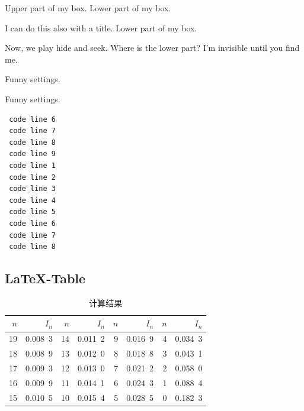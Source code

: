 \begin{tcolorbox}[colback=green!5,colframe=green!75!black]
  Upper part of my box.
  \tcblower
  Lower part of my box.
\end{tcolorbox}

\begin{tcolorbox}[colback=yellow!5,colframe=yellow!75!black,title=My title]
  I can do this also with a title.
  \tcblower
  Lower part of my box.
\end{tcolorbox}

\begin{tcolorbox}[colback=yellow!10,colframe=red!75!black,lowerbox=invisible,
  savelowerto=\jobname_ex.tex]
  Now, we play hide and seek. Where is the lower part?
  \tcblower
  I'm invisible until you find me.
\end{tcolorbox}

\begin{tcolorbox}[colback=yellow!10,colframe=red!75!black,title=Here I am]
  
\end{tcolorbox}

\begin{tcolorbox}[colback=blue!50,colframe=blue!25!black,coltext=yellow,
    fontupper=\Large\bfseries,arc=6mm,boxrule=2mm,boxsep=5mm]
  Funny settings.
\end{tcolorbox}

\begin{tcolorbox}[colback=blue!5,colframe=blue!75!black,coltext=black]
  Funny settings.
\end{tcolorbox}

\begin{lstlisting}
 code line 6
 code line 7
 code line 8
 code line 9
 code line 1
 code line 2
 code line 3
 code line 4
 code line 5
 code line 6
 code line 7
 code line 8
  \end{lstlisting}


\subsection{\LaTeX-Table}

\begin{table}[h]\begin{center}\color{darkblue}\caption{计算结果}\color{black}\label{tab1-2}
{\footnotesize
\begin{tabular}{r|r||r|r||r|r||r|r}\arrayrulecolor{darkblue}\hline\rowcolor{lightblue}
  $n$&$I_n$&$n$&$I_n$&$n$&$I_n$&$n$&$I_n$\\\hline
  19&0.008\ 3&14&0.011\ 2&9&0.016\ 9&4&0.034\ 3\\
  18&0.008\ 9&13&0.012\ 0&8&0.018\ 8&3&0.043\ 1\\
  17&0.009\ 3&12&0.013\ 0&7&0.021\ 2&2&0.058\ 0\\
  16&0.009\ 9&11&0.014\ 1&6&0.024\ 3&1&0.088\ 4\\
  15&0.010\ 5&10&0.015\ 4&5&0.028\ 5&0&0.182\ 3\\\hline
 \end{tabular}}\end{center}\end{table}


